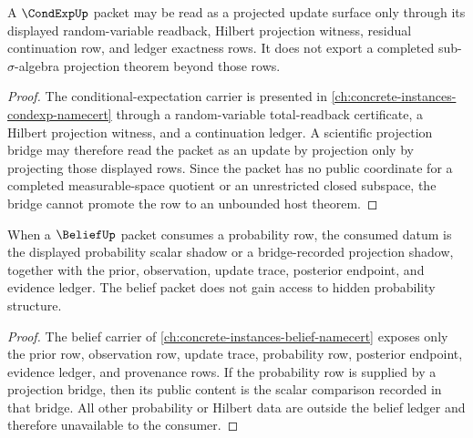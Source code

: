 \begin{theorem}
\label{thm:philosophy-conditional-expectation-projected-update-surface}
A $\CondExpUp$ packet may be read as a projected update surface only through
its displayed random-variable readback, Hilbert projection witness, residual
continuation row, and ledger exactness rows. It does not export a completed
sub-$\sigma$-algebra projection theorem beyond those rows.
\end{theorem}
\begin{proof}
The conditional-expectation carrier is presented in
\autoref{ch:concrete-instances-condexp-namecert} through a random-variable
total-readback certificate, a Hilbert projection witness, and a continuation
ledger. A scientific projection bridge may therefore read the packet as an
update by projection only by projecting those displayed rows. Since the packet
has no public coordinate for a completed measurable-space quotient or an
unrestricted closed subspace, the bridge cannot promote the row to an
unbounded host theorem.
\end{proof}

\begin{corollary}
\label{cor:philosophy-belief-updates-consume-probability-projections}
When a $\BeliefUp$ packet consumes a probability row, the consumed datum is
the displayed probability scalar shadow or a bridge-recorded projection
shadow, together with the prior, observation, update trace, posterior endpoint,
and evidence ledger. The belief packet does not gain access to hidden
probability structure.
\end{corollary}
\begin{proof}
The belief carrier of \autoref{ch:concrete-instances-belief-namecert} exposes
only the prior row, observation row, update trace, probability row, posterior
endpoint, evidence ledger, and provenance rows. If the probability row is
supplied by a projection bridge, then its public content is the scalar
comparison recorded in that bridge. All other probability or Hilbert data are
outside the belief ledger and therefore unavailable to the consumer.
\end{proof}

